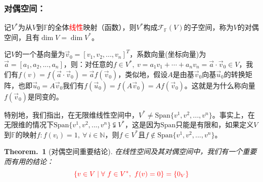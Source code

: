 \documentclass[zihao=5,UTF8]{report}
\theoremstyle{mystyle} %
\newtheorem{theorem}{Theorem.\,}
\begin{document}
\subsubsection{对偶空间：}
记$V^*$为从$V$到$\mathbb{F}$的全体\textcolor{red}{线性}映射（函数），则$V^*$构成$\mathcal{F}_{\mathbb{F}}(V)$的子空间，称为$V$的对偶空间，且有$\dim V = \dim V^*$。\par
{\color{gray}\small 记$V$的一个基向量为$\vec{v}_0 = [v_1,v_2,...,v_n]^T$，系数向量(坐标向量)为$\vec{a} = [a_1,a_2,...,a_n]$，则：对任意的$f \in V^*,\ v = a_1v_1 + \cdots + a_nv_n  = \vec{a}\cdot \vec{v}_0\in V$，我们有$f(v) = f(\vec{a}\cdot \vec{v}_0)= \vec{a}f(\vec{v}_0) $，类似地，假设$A$是由基$\vec{v}_0$向基$\vec{u}_0$的转换矩阵，也即$\vec{u}_0 = A\vec{v}_0$我们有$f(\vec{u}_0) = f(A\vec{v}_0) = Af(\vec{v}_0)$。这就是为什么称向量$f(\vec{v}_0)$是同变的。\par
特别地，我们指出，在无限维线性空间中，$V^* \ne \text{Span} \{v^1,v^2,...,v^n\}$。事实上，在无限维的情况下$\text{Span} \{v^1,v^2,...,v^n\} \subsetneqq V^*$，这是因为$\text{Span}$只能是有限和，如果定义$V$到$\mathbb{F}$的映射$f: f(v_i) = 1,\ \forall\ i \in \mathbb{N}$，则$f \in V^*$且$f \notin \text{Span}\{v^1,v^2,...,v^n\}$。}

\begin{theorem}[对偶空间重要结论]\label{对偶空间重要结论}
    在线性空间及其对偶空间中，我们有一个重要而有用的结论：
    \begin{equation*}
       \textcolor{red}{ \{v \in V \mid \forall\ f \in V^*,\ f(v) = 0\} = \{0_V\}}
    \end{equation*}
\end{theorem}
\end{document}
